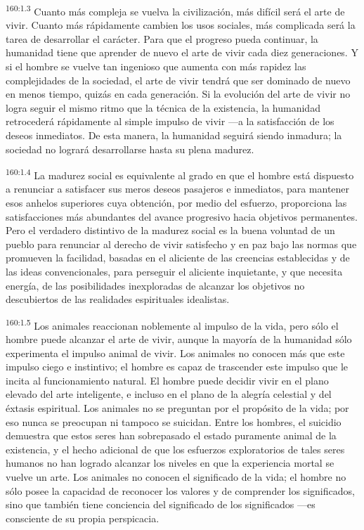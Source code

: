 \par 
\textsuperscript{160:1.3} Cuanto más compleja se vuelva la civilización, más difícil será el arte de vivir. Cuanto más rápidamente cambien los usos sociales, más complicada será la tarea de desarrollar el carácter. Para que el progreso pueda continuar, la humanidad tiene que aprender de nuevo el arte de vivir cada diez generaciones. Y si el hombre se vuelve tan ingenioso que aumenta con más rapidez las complejidades de la sociedad, el arte de vivir tendrá que ser dominado de nuevo en menos tiempo, quizás en cada generación. Si la evolución del arte de vivir no logra seguir el mismo ritmo que la técnica de la existencia, la humanidad retrocederá rápidamente al simple impulso de vivir ---a la satisfacción de los deseos inmediatos. De esta manera, la humanidad seguirá siendo inmadura; la sociedad no logrará desarrollarse hasta su plena madurez.

\par 
\textsuperscript{160:1.4} La madurez social es equivalente al grado en que el hombre está dispuesto a renunciar a satisfacer sus meros deseos pasajeros e inmediatos, para mantener esos anhelos superiores cuya obtención, por medio del esfuerzo, proporciona las satisfacciones más abundantes del avance progresivo hacia objetivos permanentes. Pero el verdadero distintivo de la madurez social es la buena voluntad de un pueblo para renunciar al derecho de vivir satisfecho y en paz bajo las normas que promueven la facilidad, basadas en el aliciente de las creencias establecidas y de las ideas convencionales, para perseguir el aliciente inquietante, y que necesita energía, de las posibilidades inexploradas de alcanzar los objetivos no descubiertos de las realidades espirituales idealistas.

\par 
\textsuperscript{160:1.5} Los animales reaccionan noblemente al impulso de la vida, pero sólo el hombre puede alcanzar el arte de vivir, aunque la mayoría de la humanidad sólo experimenta el impulso animal de vivir. Los animales no conocen más que este impulso ciego e instintivo; el hombre es capaz de trascender este impulso que le incita al funcionamiento natural. El hombre puede decidir vivir en el plano elevado del arte inteligente, e incluso en el plano de la alegría celestial y del éxtasis espiritual. Los animales no se preguntan por el propósito de la vida; por eso nunca se preocupan ni tampoco se suicidan. Entre los hombres, el suicidio demuestra que estos seres han sobrepasado el estado puramente animal de la existencia, y el hecho adicional de que los esfuerzos exploratorios de tales seres humanos no han logrado alcanzar los niveles en que la experiencia mortal se vuelve un arte. Los animales no conocen el significado de la vida; el hombre no sólo posee la capacidad de reconocer los valores y de comprender los significados, sino que también tiene conciencia del significado de los significados ---es consciente de su propia perspicacia.

